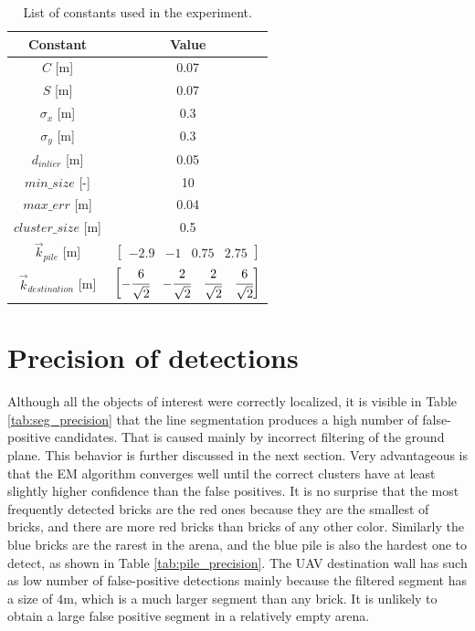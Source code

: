 \begin{table}[H]
	\centering
	\caption{List of constants used in the experiment.}
	\begin{tabular}{cc}
		\toprule
		Constant & Value \\
		\midrule
		$C$ [m] & 0.07   \\ 
		$S$ [m] & 0.07  \\
		$\sigma_x$ [m] & 0.3 \\ 
		$\sigma_y$ [m] & 0.3 \\
		$d_{inlier}$ [m] & 0.05 \\ 
		$min\_size$ [-] & 10 \\
		$max\_err$ [m] & 0.04 \\
		$cluster\_size$ [m] & 0.5 \\
		$\vec{k}_{pile} $ [m] & $\begin{bmatrix}
			-2.9 & -1 & 0.75 & 2.75
		\end{bmatrix}$ \\
		$\vec{k}_{destination}$ [m] &
		$\begin{bmatrix}
			-\cfrac{6}{\sqrt{2}} &  -\cfrac{2}{\sqrt{2}} &  \cfrac{2}{\sqrt{2}} &  \cfrac{6}{\sqrt{2}}
		\end{bmatrix}$ \\
		\bottomrule
	\end{tabular}
	\label{tab:constants}
\end{table}

\section{Precision of detections}
Although all the objects of interest were correctly localized, it is visible in Table \ref{tab:seg_precision} that the line segmentation produces a high number of false-positive candidates. That is caused mainly by incorrect filtering of the ground plane. This behavior is further discussed in the next section. Very advantageous is that the EM algorithm converges well until the correct clusters have at least slightly higher confidence than the false positives. It is no surprise that the most frequently detected bricks are the red ones because they are the smallest of bricks, and there are more red bricks than bricks of any other color. Similarly the blue bricks are the rarest in the arena, and the blue pile is also the hardest one to detect, as shown in Table \ref{tab:pile_precision}. The UAV destination wall has such as low number of false-positive detections mainly because the filtered segment has a size of $4$m, which is a much larger segment than any brick. It is unlikely to obtain a large false positive segment in a relatively empty arena.

